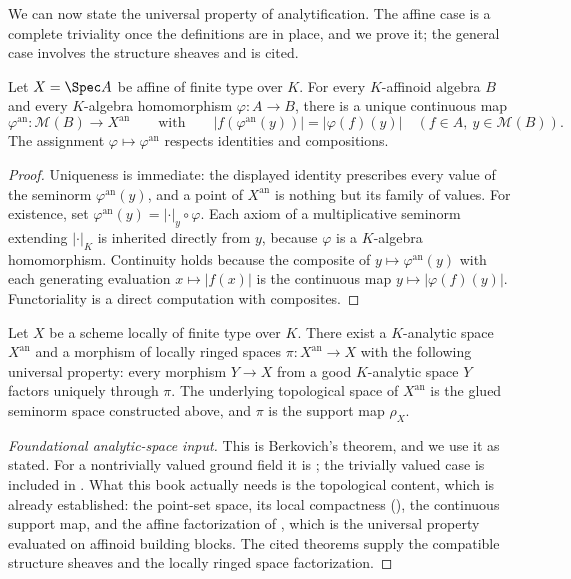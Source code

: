 We can now state the universal property of analytification.  The affine
case is a complete triviality once the definitions are in place, and we
prove it; the general case involves the structure sheaves and is cited.

\begin{proposition}
\label{prop:berk-universal-affine}
Let $X=\Spec A$ be affine of finite type over $K$.  For every
$K$-affinoid algebra $B$ and every $K$-algebra homomorphism
$\varphi:A\to B$, there is a unique continuous map
\[
 \varphi^{\mathrm{an}}:\mathcal M(B)\longrightarrow X^{\mathrm{an}}
 \qquad\text{with}\qquad
 |f(\varphi^{\mathrm{an}}(y))|=|\varphi(f)(y)|
 \quad(f\in A,\ y\in\mathcal M(B)).
\]
The assignment $\varphi\mapsto\varphi^{\mathrm{an}}$ respects identities
and compositions.
\end{proposition}

\begin{proof}
Uniqueness is immediate: the displayed identity prescribes every value of
the seminorm $\varphi^{\mathrm{an}}(y)$, and a point of
$X^{\mathrm{an}}$ is nothing but its family of values.  For existence,
set $\varphi^{\mathrm{an}}(y)=|\cdot|_y\circ\varphi$.  Each axiom of a
multiplicative seminorm extending $|\cdot|_K$ is inherited directly
from $y$, because $\varphi$ is a $K$-algebra homomorphism.
Continuity holds because the composite of
$y\mapsto\varphi^{\mathrm{an}}(y)$ with each generating evaluation
$x\mapsto|f(x)|$ is the continuous map $y\mapsto|\varphi(f)(y)|$.
Functoriality is a direct computation with composites.
\end{proof}

\begin{theorem}
\label{thm:berk-universal-property}
Let $X$ be a scheme locally of finite type over $K$.  There exist a
$K$-analytic space $X^{\mathrm{an}}$ and a morphism of locally ringed
spaces $\pi:X^{\mathrm{an}}\to X$ with the following universal
property: every morphism $Y\to X$ from a good $K$-analytic space
$Y$ factors uniquely through $\pi$.  The underlying topological space
of $X^{\mathrm{an}}$ is the glued seminorm space constructed above, and
$\pi$ is the support map $\rho_X$.
\end{theorem}

\begin{proof}[Foundational analytic-space input]
This is Berkovich's theorem, and we use it as stated.  For a nontrivially
valued ground field it is \cite[Theorem~3.4.1]{Berk12}; the trivially
valued case is included in \cite[Theorem~3.5.1]{Berk12}.  What this book
actually needs is the topological content, which is already established:
the point-set space, its local compactness
(), the continuous support map, and
the affine factorization of , which is
the universal property evaluated on affinoid building blocks.  The cited
theorems supply the compatible structure sheaves and the locally ringed
space factorization.
\end{proof}

